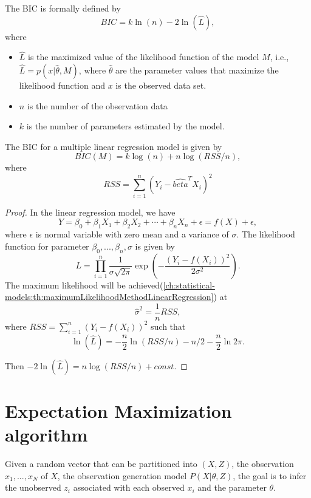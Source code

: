 \begin{refsection}
\begin{definition}
The BIC is formally defined by
$$BIC = k \ln (n) - 2\ln (\hat{L}),$$
where 
\begin{itemize}
	\item $\hat{L}$ is the maximized value of the likelihood function of the model $M$, i.e., $\hat{L} = p(x|\hat{\theta},M)$, where $\hat{\theta}$ are the parameter values that maximize the likelihood function and $x$ is the observed data set.
	\item $n$ is the number of the observation data
	\item $k$ is the number of parameters estimated by the model.
\end{itemize}	
\end{definition}


\begin{lemma}\label{ch:theory-of-statistics:th:BICFormultipleLinearRegression}
The BIC for a multiple linear regression model is given by
$$BIC(M) = k\log(n) + n\log(RSS/n),$$
where $$RSS = \sum_{i=1}^{n}(Y_i - \hat{beta}^T X_i)^2$$	
\end{lemma}
\begin{proof}
In the linear regression model, we have
$$Y = \beta_0 + \beta_1X_1 + \beta_2 X_2 + \cdots + \beta_n X_n + \epsilon = f(X) + \epsilon,$$
where $\epsilon$ is normal variable with zero mean and a variance of $\sigma$. The likelihood function for parameter $\beta_0,...,\beta_n, \sigma$ is given by
$$L = \prod_{i=1}^n \frac{1}{\sigma\sqrt{2\pi}}\exp(-\frac{(Y_i - f(X_i))^2}{2\sigma^2}).$$
The maximum likelihood will be achieved(\autoref{ch:statistical-models:th:maximumLikelihoodMethodLinearRegression}) at $$\hat{\sigma}^2 = \frac{1}{n}RSS,$$
where $RSS = \sum_{i=1}^{n}  (Y_i - f(X_i))^2$ such that
$$\ln (\hat{L}) = -\frac{n}{2}\ln(RSS/n) - n/2 -\frac{n}{2}\ln 2\pi .$$

Then $-2\ln (\hat{L}) = n\log(RSS/n) + const$.
\end{proof}







\section{Expectation Maximization algorithm}

\begin{definition}
	Given a random vector that can be partitioned into $(X,Z)$, the observation $x_1,...,x_N$ of $X$, the observation generation model $P(X|\theta, Z)$, the goal is to infer the unobserved $z_i$ associated with each observed $x_i$ and the parameter $\theta$.
\end{definition}




\end{refsection}
